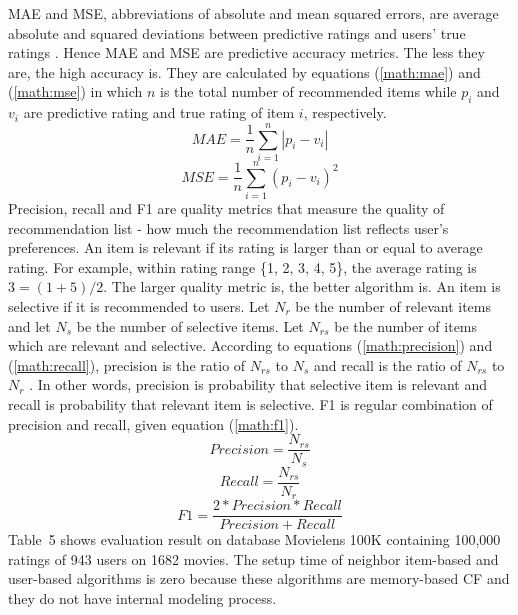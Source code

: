 \documentclass{sig-alternate}
\begin{document}
MAE and MSE, abbreviations of absolute and mean squared errors, are average absolute and squared deviations between predictive ratings and users' true ratings \cite[pp.~20-21]{herlocker:evaluation}. Hence MAE and MSE are predictive accuracy metrics. The less they are, the high accuracy is. They are calculated by equations (\ref{math:mae}) and (\ref{math:mse}) in which $n$ is the total number of recommended items while $p_i$ and $v_i$ are predictive rating and true rating of item $i$, respectively.
\begin{equation} \label{math:mae}
MAE = \frac{1}{n}\sum_{i=1}^{n}|p_i-v_i|
\end{equation}
\begin{equation} \label{math:mse}
MSE = \frac{1}{n}\sum_{i=1}^{n}(p_i-v_i)^2
\end{equation}
Precision, recall and F1 are quality metrics that measure the quality of recommendation list - how much the recommendation list reflects user's preferences. An item is relevant if its rating is larger than or equal to average rating. For example, within rating range \{1, 2, 3, 4, 5\}, the average rating is $3 = (1 + 5)/2$. The larger quality metric is, the better algorithm is. An item is selective if it is recommended to users. Let $N_r$ be the number of relevant items and let $N_s$ be the number of selective items. Let $N_{rs}$ be the number of items which are relevant and selective. According to equations (\ref{math:precision}) and (\ref{math:recall}), precision is the ratio of $N_{rs}$ to $N_s$ and recall is the ratio of $N_{rs}$ to $N_r$ \cite[p.~23]{herlocker:evaluation}. In other words, precision is probability that selective item is relevant and recall is probability that relevant item is selective. F1 is regular combination of precision and recall, given equation (\ref{math:f1}).
\begin{equation} \label{math:precision}
Precision = \frac{N_{rs}}{N_s}
\end{equation}
\begin{equation} \label{math:recall}
Recall = \frac{N_{rs}}{N_r}
\end{equation}
\begin{equation} \label{math:f1}
F1 = \frac{2*Precision*Recall}{Precision+Recall}
\end{equation}
Table~5 shows evaluation result on database Movielens 100K containing 100,000 ratings of 943 users on 1682 movies. The setup time of neighbor item-based and user-based algorithms is zero because these algorithms are memory-based CF and they do not have internal modeling process.
\end{document}
